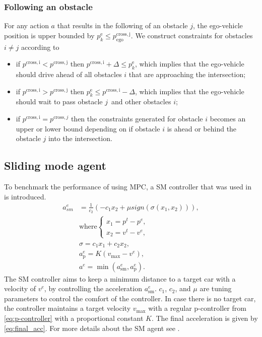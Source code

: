 \subsubsection{Following an obstacle}
For any action $a$ that results in the following of an obstacle $j$, the ego-vehicle position is upper bounded by $p^\mathrm{e}_k \leq{} p^\mathrm{cross,j}_\mathrm{ego}$. We construct constraints for obstacles $i\neq{}j$ according to
\begin{itemize}
	\item if $p^\mathrm{cross,i}<{}p^\mathrm{cross,j}$ then $p^\mathrm{cross,i}+\Delta\leq{}p_k^\mathrm{e}$, which implies that the ego-vehicle should drive ahead of all obstacles $i$ that are approaching the intersection;
	\item if $p^\mathrm{cross,i}>{}p^\mathrm{cross,j}$ then $p_k^\mathrm{e}\leq{}p^\mathrm{cross,i}-\Delta$, which implies that the ego-vehicle should wait to pass obstacle $j$ and other obstacles $i$;
	\item if $p^{\mathrm{cross,i}}=p^{\mathrm{cross},j}$ then the constraints generated for obstacle $i$ becomes an upper or lower  bound depending on if obstacle $i$ is ahead or behind the obstacle $j$ into the intersection.
\end{itemize}

\subsection{Sliding mode agent}
To benchmark the performance of using MPC, a SM controller that was used in \cite{Tram2018} is introduced. 
\begin{subequations}
	\label{eq:sliding_mode}
	\begin{align}
	a^e_{sm} &= \frac{1}{c_2} (- c_1 x_2 + \mu sign(\sigma(x_1, x_2))), \\
	&\text{where}
	\begin{cases}
	x_1 = p^t - p^e,\\
	x_2 = v^t - v^e,
	\end{cases}\\
	&\sigma = c_1 x_1 + c_2 x_2,\\
	\label{eq:p-controller}
	&a^e_\mathrm{p} = K (v_{\mathrm{max}} - v^e),\\
	\label{eq:final_acc}
	&a^e = \min(a^e_{\mathrm{sm}}, a^e_\mathrm{p} ).
	\end{align}
\end{subequations}
The SM controller aims to keep a minimum distance to a target car with a velocity of $v^e$, by controlling the acceleration $a^e_{\mathrm{sm}}$. $c_1$, $c_2$, and  $\mu$ are tuning parameters to control the comfort of the controller. In case there is no target car, the controller maintains a target velocity $v_{\mathrm{max}}$ with a regular p-controller from \eqref{eq:p-controller} with a proportional constant $K$. The final acceleration is given by \eqref{eq:final_acc}. For more details about the SM agent see \cite{Tram2018}.

